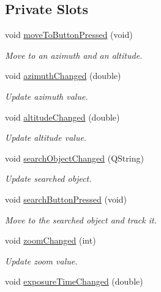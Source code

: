 \subsection*{Private Slots}
\begin{DoxyCompactItemize}
\item 
void \mbox{\hyperlink{class_autoscope_window_form_a2b958095518ce01c502f912284c9e0cf}{move\+To\+Button\+Pressed}} (void)
\begin{DoxyCompactList}\small\item\em Move to an azimuth and an altitude. \end{DoxyCompactList}\item 
void \mbox{\hyperlink{class_autoscope_window_form_a19ceb0c2b007b8adb2a0946b7851c06f}{azimuth\+Changed}} (double)
\begin{DoxyCompactList}\small\item\em Update azimuth value. \end{DoxyCompactList}\item 
void \mbox{\hyperlink{class_autoscope_window_form_ab29957fd0ac7ea266fd36ce67b3eda75}{altitude\+Changed}} (double)
\begin{DoxyCompactList}\small\item\em Update altitude value. \end{DoxyCompactList}\item 
void \mbox{\hyperlink{class_autoscope_window_form_a44ccf2b66aa6be7495190d2bb1e62e16}{search\+Object\+Changed}} (Q\+String)
\begin{DoxyCompactList}\small\item\em Update searched object. \end{DoxyCompactList}\item 
void \mbox{\hyperlink{class_autoscope_window_form_a9a392b1d4b55f5c90653aa418cfa133c}{search\+Button\+Pressed}} (void)
\begin{DoxyCompactList}\small\item\em Move to the searched object and track it. \end{DoxyCompactList}\item 
void \mbox{\hyperlink{class_autoscope_window_form_a10578baeef8b914526da55ae8d2bddc6}{zoom\+Changed}} (int)
\begin{DoxyCompactList}\small\item\em Update zoom value. \end{DoxyCompactList}\item 
void \mbox{\hyperlink{class_autoscope_window_form_a2a96899ef93c00205b604c9f4d6ad8e0}{exposure\+Time\+Changed}} (double)

\end{DoxyCompactItemize}

